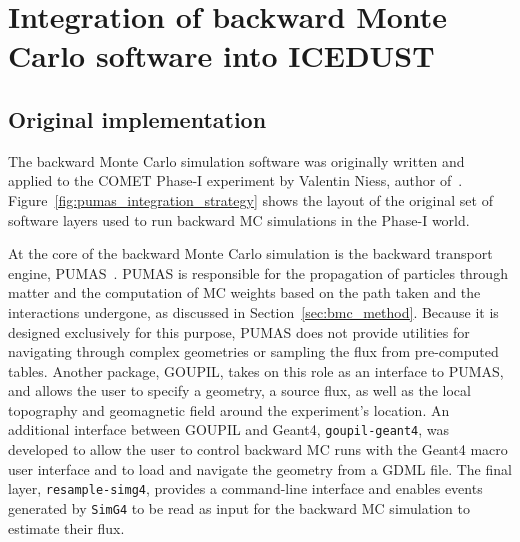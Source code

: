 \chapter{Integration of backward Monte Carlo software into
ICEDUST}
\label{app:bmc_integration}



\section{Original implementation}
The backward Monte Carlo simulation software was originally written and applied
to the COMET Phase\nobreakdash-I experiment by Valentin Niess, author
of~\cite{Niess_Barnoud_Carloganu_Menedeu_2018,NIESS2022108438}.
Figure~\ref{fig:pumas_integration_strategy} shows the layout of the original set
of software layers used to run backward MC simulations in the Phase\nobreakdash-I world. 

At the core of the backward Monte Carlo simulation is the backward transport
engine, PUMAS~\cite{NIESS2022108438}. PUMAS is responsible for the propagation
of particles through matter and the computation of MC weights based on the path
taken and the interactions undergone, as discussed in
Section~\ref{sec:bmc_method}. Because it is designed exclusively for this
purpose, PUMAS does not provide utilities for navigating through complex
geometries or sampling the flux from pre-computed tables. Another package,
GOUPIL, takes on this role as an interface to PUMAS, and allows the user to
specify a geometry, a source flux, as well as the local topography and
geomagnetic field around the experiment's location. An additional interface
between GOUPIL and {\sc Geant4}, \texttt{goupil-geant4}, was developed to allow
the user to control backward MC runs with the {\sc Geant4} macro user interface
and to load and navigate the geometry from a GDML file. The final layer,
\texttt{resample-simg4}, provides a command-line interface and enables events
generated by \texttt{SimG4} to be read as input for the backward MC simulation
to estimate their flux.


